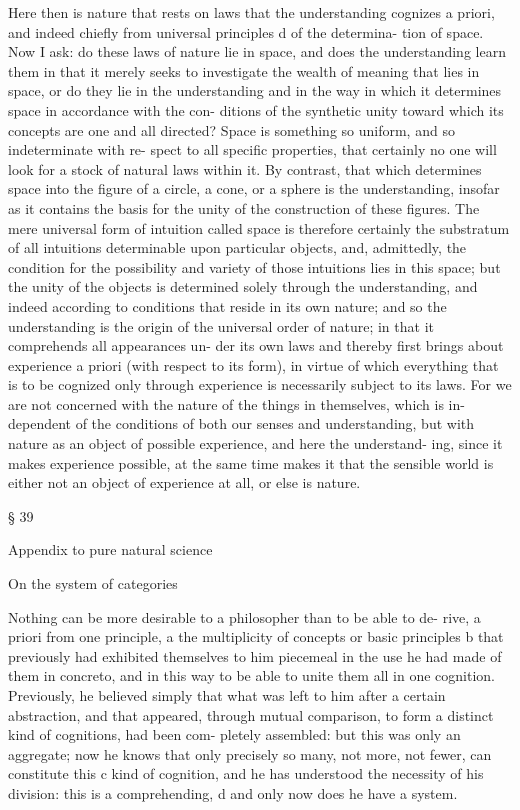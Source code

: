 Here then is nature that rests on laws that the understanding cognizes
a priori, and indeed chieﬂy from universal principles d of the determina-
tion of space. Now I ask: do these laws of nature lie in space, and does
the understanding learn them in that it merely seeks to investigate the
wealth of meaning that lies in space, or do they lie in the understanding
and in the way in which it determines space in accordance with the con-
ditions of the synthetic unity toward which its concepts are one and all
directed? Space is something so uniform, and so indeterminate with re-
spect to all speciﬁc properties, that certainly no one will look for a stock
of natural laws within it. By contrast, that which determines space into
the ﬁgure of a circle, a cone, or a sphere is the understanding, insofar
as it contains the basis for the unity of the construction of these ﬁgures.
The mere universal form of intuition called space is therefore certainly
the substratum of all intuitions determinable upon particular objects,
and, admittedly, the condition for the possibility and variety of those
intuitions lies in this space; but the unity of the objects is determined
solely through the understanding, and indeed according to conditions
that reside in its own nature; and so the understanding is the origin of
the universal order of nature; in that it comprehends all appearances un-
der its own laws and thereby ﬁrst brings about experience a priori (with
respect to its form), in virtue of which everything that is to be cognized
only through experience is necessarily subject to its laws. For we are
not concerned with the nature of the things in themselves, which is in-
dependent of the conditions of both our senses and understanding, but
with nature as an object of possible experience, and here the understand-
ing, since it makes experience possible, at the same time makes it that
the sensible world is either not an object of experience at all, or else is
nature.

§ 39

Appendix to pure natural science

On the system of categories

Nothing can be more desirable to a philosopher than to be able to de-
rive, a priori from one principle, a the multiplicity of concepts or basic
principles b that previously had exhibited themselves to him piecemeal
in the use he had made of them in concreto, and in this way to be able to
unite them all in one cognition. Previously, he believed simply that what
was left to him after a certain abstraction, and that appeared, through
mutual comparison, to form a distinct kind of cognitions, had been com-
pletely assembled: but this was only an aggregate; now he knows that
only precisely so many, not more, not fewer, can constitute this c kind of
cognition, and he has understood the necessity of his division: this is a
comprehending, d and only now does he have a system.

